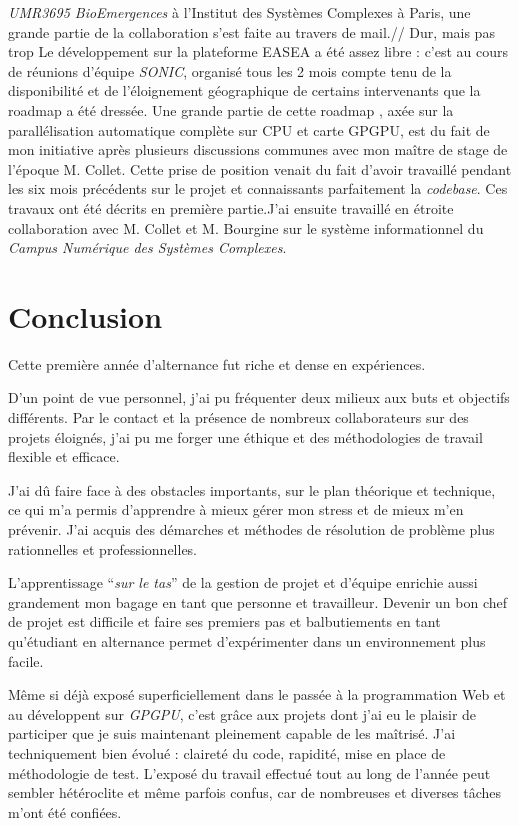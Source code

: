\documentclass[french, 11pt]{memoir}
\begin{document}
\emph{UMR3695 BioEmergences} à l'Institut des Systèmes Complexes à
Paris, une grande partie de la collaboration s'est faite au travers de
mail.// Dur, mais pas trop Le développement sur la plateforme EASEA a
été assez libre : c'est au cours de réunions d'équipe \emph{SONIC},
organisé tous les 2 mois compte tenu de la disponibilité et de
l'éloignement géographique de certains intervenants que la roadmap a été
dressée. Une grande partie de cette roadmap , axée sur la
parallélisation automatique complète sur CPU et carte GPGPU, est du fait
de mon initiative après plusieurs discussions communes avec mon maître
de stage de l'époque M. Collet. Cette prise de position venait du fait
d'avoir travaillé pendant les six mois précédents sur le projet et
connaissants parfaitement la \emph{codebase}. Ces travaux ont été
décrits en première partie.J'ai ensuite travaillé en étroite
collaboration avec M. Collet et M. Bourgine sur le système
informationnel du \emph{Campus Numérique des Systèmes Complexes}.

\section{Conclusion}\label{conclusion}

Cette première année d'alternance fut riche et dense en expériences.

D'un point de vue personnel, j'ai pu fréquenter deux milieux aux buts et
objectifs différents. Par le contact et la présence de nombreux
collaborateurs sur des projets éloignés, j'ai pu me forger une éthique
et des méthodologies de travail flexible et efficace.

J'ai dû faire face à des obstacles importants, sur le plan théorique et
technique, ce qui m'a permis d'apprendre à mieux gérer mon stress et de
mieux m'en prévenir. J'ai acquis des démarches et méthodes de résolution
de problème plus rationnelles et professionnelles.

L'apprentissage ``\emph{sur le tas}'' de la gestion de projet et
d'équipe enrichie aussi grandement mon bagage en tant que personne et
travailleur. Devenir un bon chef de projet est difficile et faire ses
premiers pas et balbutiements en tant qu'étudiant en alternance permet
d'expérimenter dans un environnement plus facile.

Même si déjà exposé superficiellement dans le passée à la programmation
Web et au développent sur \emph{GPGPU}, c'est grâce aux projets dont
j'ai eu le plaisir de participer que je suis maintenant pleinement
capable de les maîtrisé. J'ai techniquement bien évolué : claireté du
code, rapidité, mise en place de méthodologie de test. L'exposé du
travail effectué tout au long de l'année peut sembler hétéroclite et
même parfois confus, car de nombreuses et diverses tâches m'ont été
confiées.
\end{document}
